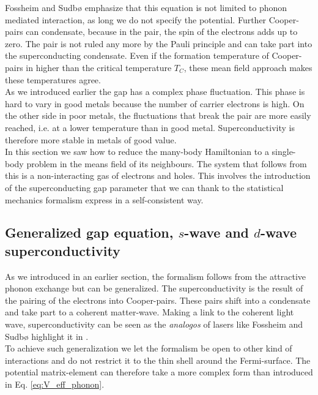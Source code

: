 \documentclass[../main.tex]{subfile}
\begin{document}
Fossheim and Sudbø \cite{FossheimSudbo2004} emphasize that this equation is not limited to phonon mediated interaction, as long we
do not specify the potential. Further Cooper-pairs can condensate, because in the pair, the spin of the electrons adds up to zero.
The pair is not ruled any more by the Pauli principle and can take part into the superconducting condensate.
Even if the formation temperature of Cooper-pairs in higher than the critical temperature $T_C$, these mean field approach makes these temperatures agree.\\

As we introduced earlier the gap has a complex phase fluctuation. This phase is hard to vary in good metals because the number of carrier electrons is high.
On the other side in poor metals, the fluctuations that break the pair are more easily reached, i.e. at a lower temperature than in good metal. Superconductivity
is therefore more stable in metals of good value.\\

In this section we saw how to reduce the many-body Hamiltonian to a single-body problem in the means field of its neighbours. The system that follows from this
is a non-interacting gas of electrons and holes. This involves the introduction of the 
superconducting gap parameter that we can thank to the statistical mechanics formalism express in a self-consistent way.


\subsection{Generalized gap equation, $s$-wave and $d$-wave superconductivity}
As we introduced in an earlier section, the formalism follows from the attractive phonon exchange but can be generalized. The superconductivity
is the result of the pairing of the electrons into Cooper-pairs. These pairs shift into a condensate and take part to a coherent matter-wave.
Making a link to the coherent light wave, superconductivity can be seen as the \textit{analogos} of lasers like Fossheim and Sudbø 
highlight it in \cite{FossheimSudbo2004}.\\

To achieve such generalization we let the formalism be open to other kind of interactions and do not restrict it to the thin shell around the Fermi-surface.
The potential matrix-element can therefore take a more complex form than introduced in Eq. \ref{eq:V_eff_phonon}.\\
\end{document}
